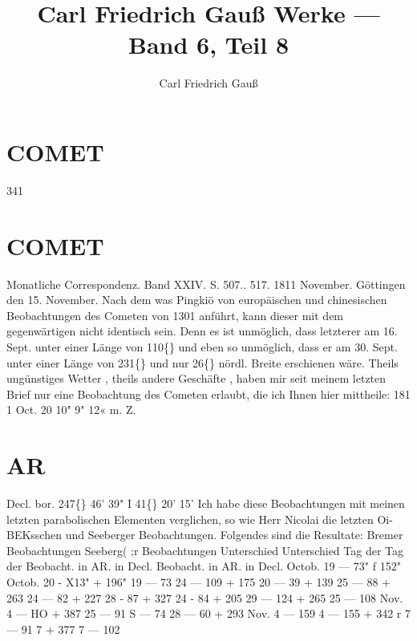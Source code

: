 \documentclass[12pt,a4paper]{article}
\title{Carl Friedrich Gau\ss{} Werke --- Band 6, Teil 8}
\author{Carl Friedrich Gau\ss{}}
\date{}
\newcommand{\degree}{\textdegree}
\begin{document}
\maketitle
\thispagestyle{fancy}


\newpage

\section*{COMET}
341 

\section*{COMET}
Monatliche  Correspondenz.     Band  XXIV.  S.  507..  517.     1811  November. 
Göttingen  den  15.  November. 
Nach  dem  was  Pingkiö  von  europäischen  und  chinesischen  Beobachtungen  des  Cometen  von  1301 
anführt,  kann  dieser  mit  dem  gegenwärtigen  nicht  identisch  sein.  Denn  es  ist  unmöglich,  dass  letzterer 
am  16.  Sept.  unter  einer  Länge  von  110\degree\{\}  und  eben  so  unmöglich,  dass  er  am  30.  Sept.  unter  einer  Länge 
von  231\degree\{\}  und  nur  26\degree\{\}  nördl.  Breite  erschienen  wäre. 
Theils  ungünstiges  Wetter ,  theils  andere  Geschäfte ,  haben  mir  seit  meinem  letzten  Brief  nur 
eine  Beobachtung  des  Cometen  erlaubt,  die  ich  Ihnen  hier  mittheile: 
181 1  Oct.  20  10"  9"  12«  m.  Z. 

\section*{AR}
Decl.  bor. 
247\degree\{\}  46'  39"     I     41\degree\{\}  20'  15' 
Ich  habe    diese  Beobachtungen    mit  meinen  letzten  parabolischen  Elementen  verglichen,   so  wie 
Herr  Nicolai  die  letzten  Oi-BEKsschen  und  Seeberger  Beobachtungen.    Folgendes  sind  die  Resultate: 
Bremer  Beobachtungen 
Seeberg( ;r  Beobachtungen 
Unterschied 
Unterschied 
Tag  der 
Tag  der 
Beobacht. 
in  AR. 
in  Decl. 
Beobacht. 
in  AR. 
in  Decl. 
Octob.  19 
---   73" 
f  152" 
Octob.  20 
-  X13" 
+  196" 
19 
---    73 
24 
---  109 
+  175 
20 
---    39 
+  139 
25 
---    88 
+  263 
24 
---    82 
+  227 
28 
-    87 
+  327 
24 
-    84 
+  205 
29 
---  124 
+  265 
25 
---  108 
Nov.      4 
---  HO 
+  387 
25 
---   91 
S 
---    74 
28 
---    60 
+  293 
Nov.      4 
---  159 
4 
---  155 
+  342 
r 
7 
---    91 
7 
+  377 
7 
---  102 
\end{document}
